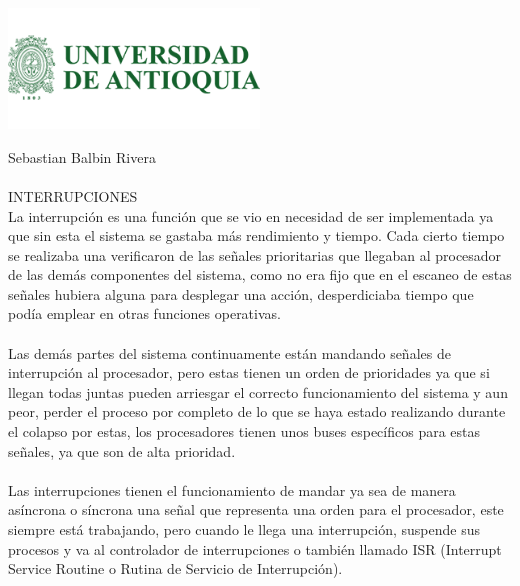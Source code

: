 \documentclass{letter}
\begin{document}
\begin{center}
\includegraphics[width=0.5\textwidth]{logo-udea.png}\\
\end{center}

Sebastian Balbin Rivera\\\\
INTERRUPCIONES\\

La interrupción es una función que se vio en necesidad de ser implementada ya que sin esta el sistema se gastaba más rendimiento y tiempo. Cada cierto tiempo se realizaba una verificaron de las señales prioritarias que llegaban al procesador de las demás componentes del sistema, como no era fijo que en el escaneo de estas señales hubiera alguna para desplegar una acción, desperdiciaba tiempo que podía emplear en otras funciones operativas. \\\\
Las demás partes del sistema continuamente están mandando señales de interrupción al procesador, pero estas tienen un orden de prioridades ya que si llegan todas juntas pueden arriesgar el correcto funcionamiento del sistema y aun peor, perder el proceso por completo de lo que se haya estado realizando durante el colapso por estas, los procesadores tienen unos buses específicos para estas señales, ya que son de alta prioridad.\\\\ 
Las interrupciones tienen el funcionamiento de mandar ya sea de manera asíncrona o síncrona una señal que representa una orden para el procesador, este siempre está trabajando, pero cuando le llega una interrupción, suspende sus procesos y va al controlador de interrupciones o también llamado ISR (Interrupt Service Routine o Rutina de Servicio de Interrupción). 
\end{document}
